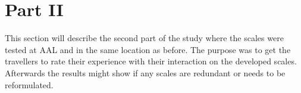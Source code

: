 \section{Part II}
This section will describe the second part of the study where the scales were tested at AAL and in the same location as before. The purpose was to get the travellers to rate their experience with their interaction on the developed scales. Afterwards the results might show if any scales are redundant or needs to be reformulated.






